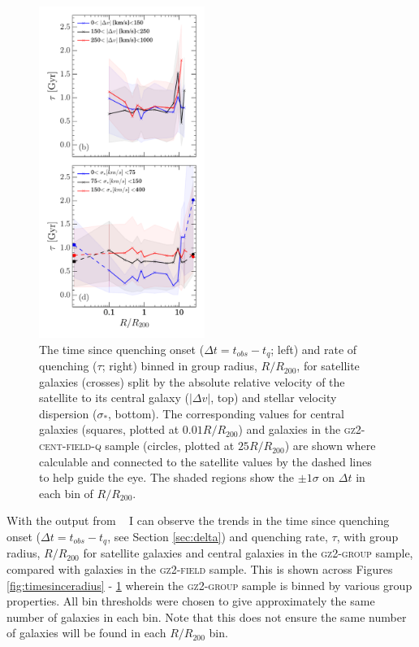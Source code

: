 \begin{figure}
{\includegraphics[width=0.48\textwidth]{environment/rate_of_quenching_delv_sigma.pdf}
\caption[Trend of $\Delta t$ and $\tau$ with group radius split by relative velocity and stellar velocity dispersion]{The time since quenching onset ($\Delta t = t_{obs} - t_{q}$; left) and rate of quenching ($\tau$; right) binned in group radius, $R/R_{200}$, for satellite galaxies (crosses) split by the absolute relative velocity of the satellite to its central galaxy ($|\Delta v|$, top) and stellar velocity dispersion ($\sigma_*$, bottom). The corresponding values for central galaxies (squares, plotted at $0.01 R/R_{200}$) and galaxies in the \textsc{gz2-cent-field-q} sample (circles, plotted at $25 R/R_{200}$) are shown where calculable and connected to the satellite values by the dashed lines to help guide the eye. The shaded regions show the $\pm1\sigma$ on $\Delta t$ in each bin of $R/R_{200}$.}
\label{fig:timesinceradiusvel}}
\end{figure}

With the output from \starpy~ I can observe the trends in the time since quenching onset ($\Delta t = t_{obs} - t_{q}$, see Section \ref{sec:delta}) and quenching rate, $\tau$, with group radius, $R/R_{200}$ for satellite galaxies and central galaxies in the \textsc{gz2-group} sample, compared with galaxies in the \textsc{gz2-field} sample. This is shown across Figures \ref{fig:timesinceradius} - \ref{fig:timesinceradiusvel} wherein the \textsc{gz2-group} sample is binned by various group properties. All bin thresholds were chosen to give approximately the same number of galaxies in each bin. Note that this does not ensure the same number of galaxies will be found in each $R/R_{200}$ bin. 

